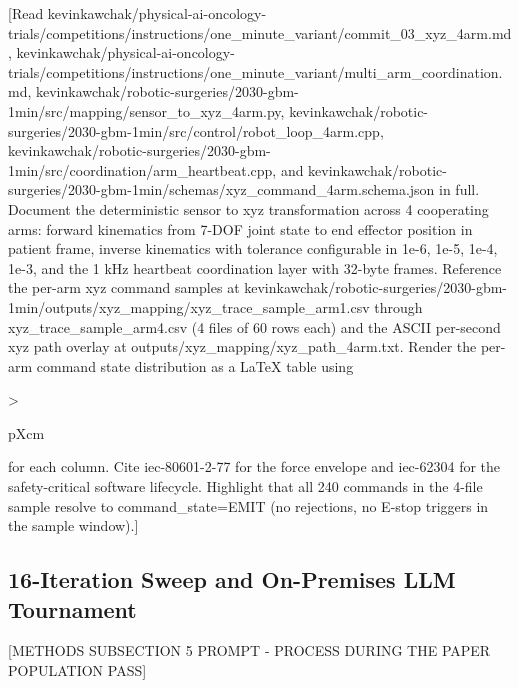 [Read
kevinkawchak/physical-ai-oncology-trials/competitions/instructions/one_minute_variant/commit_03_xyz_4arm.md,
kevinkawchak/physical-ai-oncology-trials/competitions/instructions/one_minute_variant/multi_arm_coordination.md,
kevinkawchak/robotic-surgeries/2030-gbm-1min/src/mapping/sensor_to_xyz_4arm.py,
kevinkawchak/robotic-surgeries/2030-gbm-1min/src/control/robot_loop_4arm.cpp,
kevinkawchak/robotic-surgeries/2030-gbm-1min/src/coordination/arm_heartbeat.cpp,
and
kevinkawchak/robotic-surgeries/2030-gbm-1min/schemas/xyz_command_4arm.schema.json
in full. Document the deterministic sensor to xyz transformation
across 4 cooperating arms: forward kinematics from 7-DOF joint state
to end effector position in patient frame, inverse kinematics with
tolerance configurable in {1e-6, 1e-5, 1e-4, 1e-3}, and the
1 kHz heartbeat coordination layer with 32-byte frames. Reference the
per-arm xyz command samples at
kevinkawchak/robotic-surgeries/2030-gbm-1min/outputs/xyz_mapping/xyz_trace_sample_arm1.csv
through xyz_trace_sample_arm4.csv (4 files of 60 rows each) and the
ASCII per-second xyz path overlay at outputs/xyz_mapping/xyz_path_4arm.txt.
Render the per-arm command state distribution as a LaTeX table using
{>{\raggedright\arraybackslash}p{Xcm}} for each column. Cite
iec-80601-2-77 for the force envelope and iec-62304 for the
safety-critical software lifecycle. Highlight that all 240 commands
in the 4-file sample resolve to command_state=EMIT (no rejections,
no E-stop triggers in the sample window).]

\subsection{16-Iteration Sweep and On-Premises LLM Tournament}
\label{sec:methods-iterations}

[METHODS SUBSECTION 5 PROMPT - PROCESS DURING THE PAPER POPULATION PASS]


